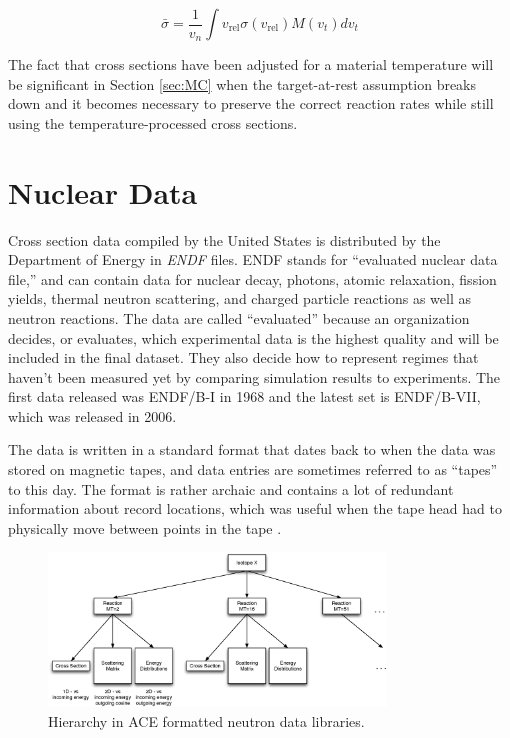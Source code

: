 \begin{equation}
\bar{\sigma} = \frac{1}{v_n} \int v_\mathrm{rel} \sigma(v_\mathrm{rel}) M(v_t) dv_t
\label{broaden}
\end{equation}

The fact that cross sections have been adjusted for a material temperature will be significant in Section \ref{sec:MC} when the target-at-rest assumption breaks down and it becomes necessary to preserve the correct reaction rates while still using the temperature-processed cross sections.

\section{Nuclear Data}

Cross section data compiled by the United States is distributed by the Department of Energy in \emph{ENDF} files.  ENDF stands for ``evaluated nuclear data file,'' and can contain data for nuclear decay, photons, atomic relaxation, fission yields, thermal neutron scattering, and charged particle reactions as well as neutron reactions.  The data are called ``evaluated'' because an organization decides, or evaluates, which experimental data is the highest quality and will be included in the final dataset.  They also decide how to represent regimes that haven't been measured yet by comparing simulation results to experiments.   The first data released was ENDF/B-I in 1968 and the latest set is ENDF/B-VII, which was released in 2006.  

The data is written in a standard format that dates back to when the data was stored on magnetic tapes, and data entries are sometimes referred to as ``tapes'' to this day.  The format is rather archaic and contains a lot of redundant information about record locations, which was useful when the tape head had to physically move between points in the tape \cite{endfnums}.  

\begin{figure}[h!]
  \centering
    \includegraphics[width=0.8\textwidth]{graphics/data_levels.eps}
     \caption{Hierarchy in ACE formatted neutron data libraries.  \label{data_levels}}
\end{figure}

